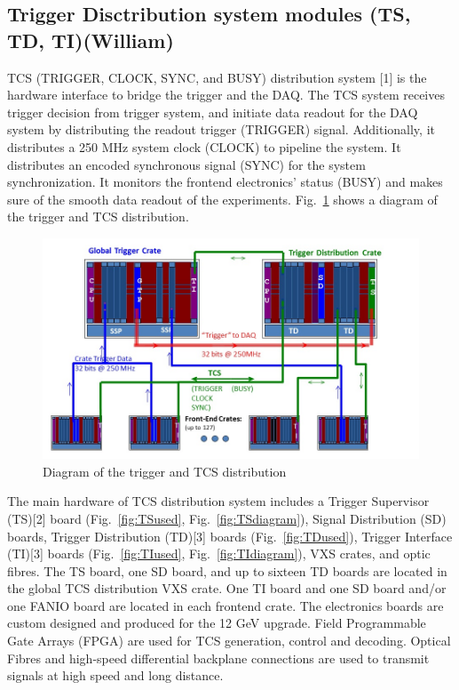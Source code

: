 \subsection{Trigger Disctribution system modules (TS, TD, TI)(William)}
	
TCS (TRIGGER, CLOCK, SYNC, and BUSY) distribution system [1] is the hardware interface to bridge the trigger and the DAQ.  The TCS system receives trigger decision from trigger system, and initiate data readout for the DAQ system by distributing the readout trigger (TRIGGER) signal.  Additionally, it distributes a 250 MHz system clock (CLOCK) to pipeline the system.  It distributes an encoded synchronous signal (SYNC) for the system synchronization.  It monitors the frontend electronics’ status (BUSY) and makes sure of the smooth data readout of the experiments. Fig.~\ref{fig:TCSdiagram} shows a diagram of the trigger and TCS distribution.

\begin{figure}[hbt]
	\centering
	\includegraphics[width=1.0\columnwidth,keepaspectratio]{img/TCSdiagram.jpg}
	\caption{Diagram of the trigger and TCS distribution}
	\label{fig:TCSdiagram}
\end{figure}


The main hardware of TCS distribution system includes a Trigger Supervisor (TS)[2] board (Fig.~\ref{fig:TSused}, Fig.~\ref{fig:TSdiagram}), Signal Distribution (SD) boards, Trigger Distribution (TD)[3] boards  (Fig.~\ref{fig:TDused}), Trigger Interface (TI)[3] boards  (Fig.~\ref{fig:TIused}, Fig.~\ref{fig:TIdiagram}), VXS crates, and optic fibres.  The TS board, one SD board, and up to sixteen TD boards are located in the global TCS distribution VXS crate.  One TI board and one SD board and/or one FANIO board are located in each frontend crate.  The electronics boards are custom designed and produced for the 12 GeV upgrade.  Field Programmable Gate Arrays (FPGA) are used for TCS generation, control and decoding.  Optical Fibres and high-speed differential backplane connections are used to transmit signals at high speed and long distance.  

